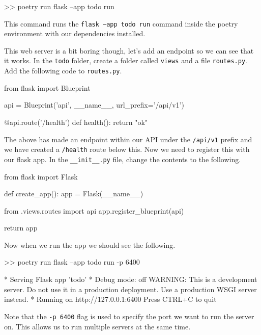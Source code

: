 \documentclass{csse4400}
\begin{document}
\begin{code}[language=bash,numbers=none]{}
  >> poetry run flask --app todo run
\end{code}

This command runs the \texttt{flask --app todo run} command inside the poetry environment with our dependencies installed.

This web server is a bit boring though, let's add an endpoint so we can see that it works.
In the \texttt{todo} folder, create a folder called \texttt{views} and a file \texttt{routes.py}.
Add the following code to \texttt{routes.py}.

\begin{code}[language=python]{}

  from flask import Blueprint

  api = Blueprint('api', __name__, url_prefix='/api/v1')

  @api.route('/health')
  def health():
      return "ok"

\end{code}

The above has made an endpoint within our API under the \texttt{/api/v1} prefix and we have created a \texttt{/health} route below this.
Now we need to register this with our flask app.
In the \texttt{\_\_init\_\_.py} file, change the contents to the following.

\begin{code}[language=python]{}
  from flask import Flask

  def create_app():
      app = Flask(__name__)
      
      from .views.routes import api
      app.register_blueprint(api)
      
      return app

\end{code}

Now when we run the app we should see the following.

\begin{code}[language=bash,numbers=none]{}
  >> poetry run flask --app todo run -p 6400

  * Serving Flask app 'todo'
  * Debug mode: off
  WARNING: This is a development server. Do not use it in a production deployment. Use a production WSGI server instead.
  * Running on http://127.0.0.1:6400
  Press CTRL+C to quit
\end{code}

Note that the \texttt{-p 6400} flag is used to specify the port we want to run the server on.
This allows us to run multiple servers at the same time.
\end{document}
